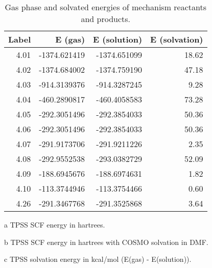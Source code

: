 \begin{table}[!htb]
\centering
 \begin{threeparttable}
  \caption[Gas phase and solvated energies for mechanism reactants and products]{Gas phase and solvated energies of mechanism reactants and products.}
    \begin{tabular}{rrrr}
    \toprule
    Label & E (gas)\tnote{a} & E (solution)\tnote{b} & E (solvation)\tnote{c} \\
    \midrule
    4.01  & -1374.621419 & -1374.651099 & 18.62 \\
    4.02  & -1374.684002 & -1374.759190 & 47.18 \\
    4.03  & -914.3139376 & -914.3287245 & 9.28 \\
    4.04  & -460.2890817 & -460.4058583 & 73.28 \\
    4.05  & -292.3051496 & -292.3854033 & 50.36 \\
    4.06  & -292.3051496 & -292.3854033 & 50.36 \\
    4.07  & -291.9173706 & -291.9211226 & 2.35 \\
    4.08  & -292.9552538 & -293.0382729 & 52.09 \\
    4.09  & -188.6945676 & -188.6974631 & 1.82 \\
    4.10  & -113.3744946 & -113.3754466 & 0.60 \\
    4.26  & -291.3467768 & -291.3525868 & 3.64 \\
    \bottomrule
    \end{tabular}%
    \begin{tablenotes}
    \item [a] TPSS SCF energy in hartrees.
    \item [b] TPSS SCF energy in hartrees with COSMO solvation in DMF.
    \item [c] TPSS solvation energy in kcal/mol (E(gas) - E(solution)).
    \end{tablenotes}
  \label{tab.supenergy}%
 \end{threeparttable}
\end{table}%



